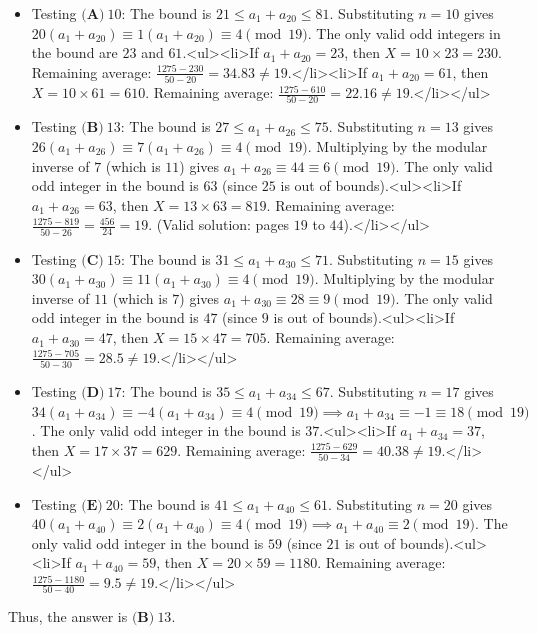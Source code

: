 \begin{enumerate}
 
            \begin{itemize}
        \item Testing $\textbf{(A)}~10$: The bound is $21 \le a_1 + a_{20} \le 81$. Substituting $n=10$ gives $20(a_1 + a_{20}) \equiv 1(a_1 + a_{20}) \equiv 4 \pmod{19}$. The only valid odd integers in the bound are $23$ and $61$.<ul><li>If $a_1 + a_{20} = 23$, then $X = 10 \times 23 = 230$. Remaining average: $\frac{1275 - 230}{50 - 20} = 34.83 \neq 19$.</li><li>If $a_1 + a_{20} = 61$, then $X = 10 \times 61 = 610$. Remaining average: $\frac{1275 - 610}{50 - 20} = 22.16 \neq 19$.</li></ul>
        \item Testing $\textbf{(B)}~13$: The bound is $27 \le a_1 + a_{26} \le 75$. Substituting $n=13$ gives $26(a_1 + a_{26}) \equiv 7(a_1 + a_{26}) \equiv 4 \pmod{19}$. Multiplying by the modular inverse of $7$ (which is $11$) gives $a_1 + a_{26} \equiv 44 \equiv 6 \pmod{19}$. The only valid odd integer in the bound is $63$ (since $25$ is out of bounds).<ul><li>If $a_1 + a_{26} = 63$, then $X = 13 \times 63 = 819$. Remaining average: $\frac{1275 - 819}{50 - 26} = \frac{456}{24} = 19$. (Valid solution: pages $19$ to $44$).</li></ul>
        \item Testing $\textbf{(C)}~15$: The bound is $31 \le a_1 + a_{30} \le 71$. Substituting $n=15$ gives $30(a_1 + a_{30}) \equiv 11(a_1 + a_{30}) \equiv 4 \pmod{19}$. Multiplying by the modular inverse of $11$ (which is $7$) gives $a_1 + a_{30} \equiv 28 \equiv 9 \pmod{19}$. The only valid odd integer in the bound is $47$ (since $9$ is out of bounds).<ul><li>If $a_1 + a_{30} = 47$, then $X = 15 \times 47 = 705$. Remaining average: $\frac{1275 - 705}{50 - 30} = 28.5 \neq 19$.</li></ul>
        \item Testing $\textbf{(D)}~17$: The bound is $35 \le a_1 + a_{34} \le 67$. Substituting $n=17$ gives $34(a_1 + a_{34}) \equiv -4(a_1 + a_{34}) \equiv 4 \pmod{19} \implies a_1 + a_{34} \equiv -1 \equiv 18 \pmod{19}$. The only valid odd integer in the bound is $37$.<ul><li>If $a_1 + a_{34} = 37$, then $X = 17 \times 37 = 629$. Remaining average: $\frac{1275 - 629}{50 - 34} = 40.38 \neq 19$.</li></ul>
        \item Testing $\textbf{(E)}~20$: The bound is $41 \le a_1 + a_{40} \le 61$. Substituting $n=20$ gives $40(a_1 + a_{40}) \equiv 2(a_1 + a_{40}) \equiv 4 \pmod{19} \implies a_1 + a_{40} \equiv 2 \pmod{19}$. The only valid odd integer in the bound is $59$ (since $21$ is out of bounds).<ul><li>If $a_1 + a_{40} = 59$, then $X = 20 \times 59 = 1180$. Remaining average: $\frac{1275 - 1180}{50 - 40} = 9.5 \neq 19$.</li></ul>
            \end{itemize}
            Thus, the answer is $\boxed{\textbf{(B)} ~13}$.


\end{enumerate}
